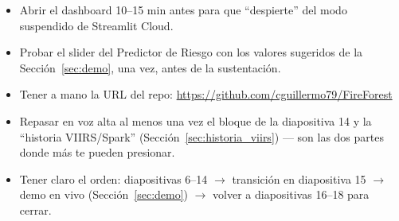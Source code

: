 \documentclass[11pt,a4paper]{article}
\begin{document}
\begin{itemize}[label=$\square$]
    \item Abrir el dashboard 10--15 min antes para que ``despierte'' del modo suspendido de Streamlit Cloud.
    \item Probar el slider del Predictor de Riesgo con los valores sugeridos de la Secci\'on~\ref{sec:demo}, una vez, antes de la sustentaci\'on.
    \item Tener a mano la URL del repo: \url{https://github.com/cguillermo79/FireForest}
    \item Repasar en voz alta al menos una vez el bloque de la diapositiva 14 y la ``historia VIIRS/Spark'' (Secci\'on~\ref{sec:historia_viirs}) --- son las dos partes donde m\'as te pueden presionar.
    \item Tener claro el orden: diapositivas 6--14 $\to$ transici\'on en diapositiva 15 $\to$ demo en vivo (Secci\'on~\ref{sec:demo}) $\to$ volver a diapositivas 16--18 para cerrar.
\end{itemize}
\end{document}
